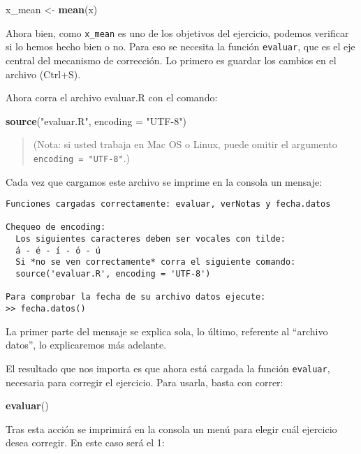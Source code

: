 \documentclass[]{article}
\newenvironment{Shaded}{}{}
\newcommand{\KeywordTok}[1]{\textcolor[rgb]{0.00,0.44,0.13}{\textbf{{#1}}}}
\newcommand{\DataTypeTok}[1]{\textcolor[rgb]{0.56,0.13,0.00}{{#1}}}
\newcommand{\StringTok}[1]{\textcolor[rgb]{0.25,0.44,0.63}{{#1}}}
\newcommand{\NormalTok}[1]{{#1}}
\begin{document}
\begin{Shaded}
\begin{Highlighting}[]
\NormalTok{x_mean <- }\KeywordTok{mean}\NormalTok{(x)}
\end{Highlighting}
\end{Shaded}
Ahora bien, como \texttt{x\_mean} es uno de los objetivos del ejercicio,
podemos verificar si lo hemos hecho bien o no. Para eso se necesita la
función \texttt{evaluar}, que es el eje central del mecanismo de
corrección. Lo primero es guardar los cambios en el archivo (Ctrl+S).

Ahora corra el archivo evaluar.R con el comando:

\begin{Shaded}
\begin{Highlighting}[]
\KeywordTok{source}\NormalTok{(}\StringTok{"evaluar.R"}\NormalTok{, }\DataTypeTok{encoding =} \StringTok{"UTF-8"}\NormalTok{)}
\end{Highlighting}
\end{Shaded}
\begin{quote}
(Nota: si usted trabaja en Mac OS o Linux, puede omitir el argumento
\texttt{encoding = "UTF-8"}.)

\end{quote}
Cada vez que cargamos este archivo se imprime en la consola un mensaje:

\begin{verbatim}
Funciones cargadas correctamente: evaluar, verNotas y fecha.datos

Chequeo de encoding:
  Los siguientes caracteres deben ser vocales con tilde:
  á - é - í - ó - ú
  Si *no se ven correctamente* corra el siguiente comando:
  source('evaluar.R', encoding = 'UTF-8')

Para comprobar la fecha de su archivo datos ejecute:
>> fecha.datos()
\end{verbatim}
La primer parte del mensaje se explica sola, lo último, referente al
``archivo datos'', lo explicaremos más adelante.

El resultado que nos importa es que ahora está cargada la función
\texttt{evaluar}, necesaria para corregir el ejercicio. Para usarla,
basta con correr:

\begin{Shaded}
\begin{Highlighting}[]
\KeywordTok{evaluar}\NormalTok{()}
\end{Highlighting}
\end{Shaded}
Tras esta acción se imprimirá en la consola un menú para elegir cuál
ejercicio desea corregir. En este caso será el 1:
\end{document}
